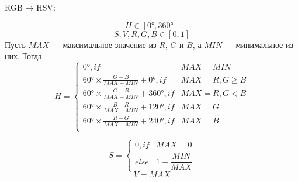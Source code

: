 \begin{figure}[ht!]
\end{figure}

RGB → HSV: 

\begin{equation}
 H \in [0°, 360°] 
 \end{equation}
 \begin{equation}
 S,V,R,G,B \in [0,1]
\end{equation}
Пусть $MAX$ — максимальное значение из $R$, $G$ и $B$, а $MIN$ — минимальное из них. Тогда
\begin{equation}
H={\begin{cases} 0°,        if& MAX=MIN \\
	60°\times {\frac  {G-B}{MAX-MIN}}+0°, if& MAX=R, G\geq B \\
	60°\times {\frac  {G-B}{MAX-MIN}}+360°, if& MAX=R, G < B \\
	60°\times {\frac  {B-R}{MAX-MIN}}+120°, if& MAX=G \\
	60°\times {\frac  {R-G}{MAX-MIN}}+240°, if& MAX= B \\
	\end{cases}}
\end{equation}

 \begin{equation}
S={\begin{cases} 0, if&{\displaystyle MAX=0} \\
else&{\displaystyle 1-{\dfrac {MIN}{MAX}}}  
	\end{cases}}	
\end{equation}
 \begin{equation}
V=MAX
\end{equation}


